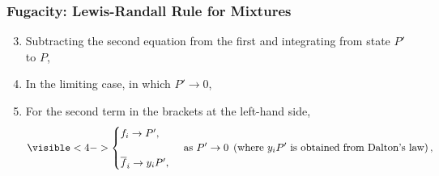 \documentclass[10pt,compress,unknownkeysallowed]{beamer}
\begin{document}
\begin{frame}
  \frametitle{Fugacity: Lewis-Randall Rule for Mixtures}
        \begin{enumerate}\setcounter{enumi}{2}  
           \item<1-> Subtracting the second equation from the first and integrating from state $P'$ to $P$, 

           \item<3-> In the limiting case, in which $P'\rightarrow 0$,

           \item<4-> For the second term in the brackets at the left-hand side,
                 \begin{displaymath}
                    \visible<4->{\begin{cases}
                       f_{i} \rightarrow P', & \\
                                     & \\
                       \overline{f}_{i} \rightarrow y_{i}P', &
                    \end{cases}}
                    \text{ as } P'\rightarrow 0  \hspace{0.1cm}\left(\text{where } y_{i}P' \text{ is obtained from Dalton's law}\right),
                 \end{displaymath}
               
        \end{enumerate}
\end{frame}
\normalsize 
\end{document}
